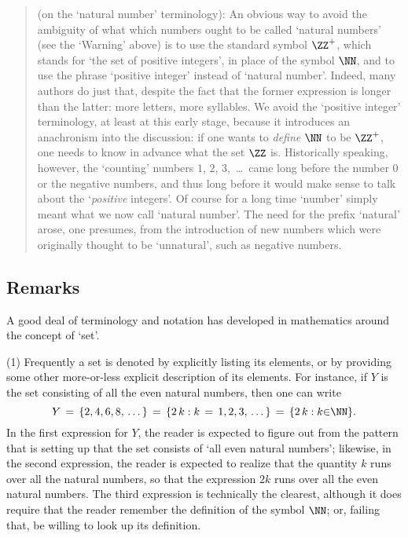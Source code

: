 \begin{quotation}
{\footnotesize \underline{\Note} (on the `natural number' terminology):
An obvious way to avoid the ambiguity of what which numbers ought to be called `natural numbers' (see the `Warning' above)
    is to use the standard symbol ${\ZZ}^{+}$, which stands for `the set of positive integers', in place of the symbol ${\NN}$,
    and to use the phrase `positive integer' instead of `natural number'. Indeed, many authors do just that, despite the fact that the former expression is longer than the latter: more letters, more syllables.
    We avoid the `positive integer' terminology, at least at this early stage, because it introduces an anachronism into the discussion:
    if one wants to {\em define} ${\NN}$ to be ${\ZZ}^{+}$, one needs to know in advance what the set ${\ZZ}$ is.
    Historically speaking, however, the `counting' numbers $1$, $2$, $3$, \,{\ldots}\, came long before the number $0$ or the negative numbers,
    and thus long before it would make sense to talk about the `{\em positive} integers'.
    Of course for a long time `number' simply meant what we now call `natural number'. The need for the prefix `natural' arose, one presumes,
    from the introduction of new numbers which were originally thought to be `unnatural', such as negative numbers.
}%
\end{quotation} 

\VV


            \subsection{\small{\bf Remarks}}
            \label{RemrkA10.07}


        A good deal of terminology and notation has developed in mathematics around the concept of `set'.

\V

        (1) Frequently a set is denoted by explicitly listing its elements, or by providing some other more-or-less explicit description of its elements.
    For instance, if $Y$ is the set consisting of all the even natural numbers, then one can write
        \begin{displaymath}
        Y  \,=\,  \{2, 4, 6, 8,\,{\ldots}\,\}  \,=\, \{2\,k: k  \,=\,  1,2,3, \,{\ldots}\, \} \,=\, \{2\,k: k{\in}{\NN}\}.
        \end{displaymath}
    In the first expression for $Y$, the reader is expected to figure out from the pattern that is setting up that the set consists of `all even natural numbers';
    likewise, in the second expression, the reader is expected to realize that the quantity $k$ runs over all the natural numbers, so that the expression $2k$ runs over all the even natural numbers.
    The third expression is technically the clearest, although it does require that the reader remember the definition of the symbol ${\NN}$;
    or, failing that, be willing to look up its definition.
    
